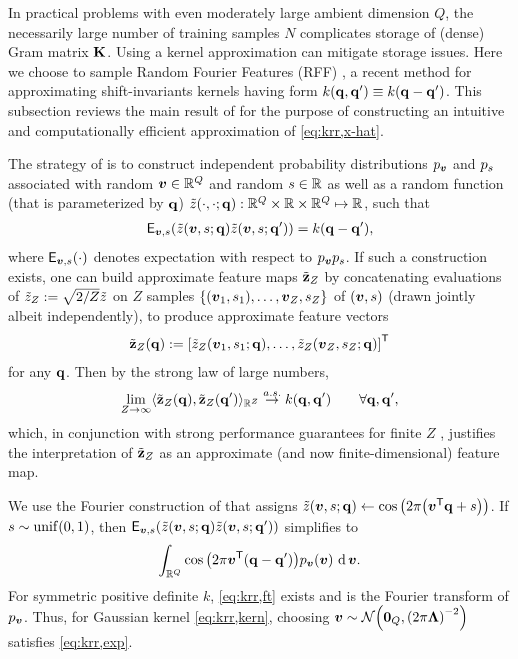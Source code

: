 In practical problems
with even moderately large ambient dimension $Q$,
the necessarily large number of training samples $N$ 
complicates storage of (dense) Gram matrix $\mathbf{K}$.
Using a kernel approximation 
can mitigate storage issues.
Here we choose
to sample Random Fourier Features (RFF) \cite{rahimi:07:rff},
a recent method 
for approximating shift-invariants kernels
having form $k\paren{\bmq,\bmq'} \equiv k\paren{\bmq-\bmq'}$.
This subsection reviews the main result of \cite{rahimi:07:rff}
for the purpose of constructing 
an intuitive and computationally efficient approximation of \eqref{eq:krr,x-hat}.

The strategy of \cite{rahimi:07:rff}
is to construct independent probability distributions 
$p_{\boldsymbol{v}}$ and $p_{s}$
associated with
random $\boldsymbol{v} \in \mathbb{R}^{Q}$ 
and random $s \in \mathbb{R}$ 
as well as a random function 
(that is parameterized by $\mathbf{q}$) 
$\zt\paren{\cdot,\cdot;\bmq} : \reals{Q} \times \real \times \reals{Q} \mapsto \real$,
such that
\begin{align}
	\expect{\bmv,s}{
		\zta{\bmv,s;\bmq}
		\zta{\bmv,s;\bmq'} 
	}
	= k(\bmq-\bmq'),
	\label{eq:krr,exp}
\end{align}
where 
$\expect{\bmv,s}{\cdot}$
denotes expectation with respect to $p_{\boldsymbol{v}}p_{s}$.
If such a construction exists,
one can build
approximate feature maps $\tilde{\mathbf{z}}_Z$
by concatenating evaluations of 
$\tilde{z}_Z:= \sqrt{2/Z}\tilde{z}$ on 
$Z$ samples 
$\set{\paren{\bmv_1,s_1},\dots,\bmv_Z,s_Z}$
of $\paren{\bmv,s}$
(drawn jointly albeit independently),
to produce approximate feature vectors
\begin{align}
	\bmztZa{\bmq} := \brac{\ztZa{\bmv_1,s_1;\bmq},\dots,\ztZa{\bmv_Z,s_Z;\bmq}}\tpose
	\label{eq:krr,feat}
\end{align}
for any $\mathbf{q}$. 
Then by the strong law of large numbers,
\begin{align}
	\lim_{Z \to \infty} \innprod{
		\bmztZa{\bmq}}{
		\bmztZa{\bmq'}
	}_{\reals{Z}} \overset{a.s.}{\to} k(\bmq,\bmq') \qquad \forall \bmq,\bmq',
	\label{eq:krr,lln}
\end{align}
which, 
in conjunction 
with strong performance guarantees
for finite $Z$ \cite{rahimi:07:rff,sutherland:15:ote}, 
justifies the interpretation 
of $\tilde{\mathbf{z}}_Z$ as an approximate 
(and now finite-dimensional) feature map.

We use the Fourier construction 
of \cite{rahimi:07:rff}
that assigns
$\zt\paren{\bmv,s;\bmq} 
\gets 
\cosa{2\pi\paren{\bmv\tpose \bmq + s}}$.
If $s\sim\unif{0,1}$, 
then 
$\expect{\bmv,s}{
		\zt\paren{\bmv,s;\bmq}
		\zt\paren{\bmv,s;\bmq'} 
}$
simplifies to
\begin{align}
	\int_{\reals{Q}} \cosa{2\pi\bmv\tpose\paren{\bmq-\bmq'}} \dist{\bmv}\paren{\bmv} \der{\bmv}.
	\label{eq:krr,ft}
\end{align}
For symmetric positive definite $k$,
\eqref{eq:krr,ft} exists \cite{wu:97:gbt} 
and is the Fourier transform 
of $p_{\boldsymbol{v}}$.
Thus, for Gaussian kernel \eqref{eq:krr,kern},
choosing $\bmv\sim\gauss{\zeros{Q}}{\paren{2\pi\bmL}^{-2}}$
satisfies \eqref{eq:krr,exp}.

